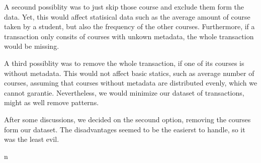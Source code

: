 A secound possiblity was to just skip those course and exclude them form the data. Yet, this would affect
statisical data such as the average amount of course taken by a student, but also the frequency of the other courses.
Furthermore, if a transaction only consits of courses with unkown metadata, the whole transaction would be missing.


A third possiblity was to remove the whole transaction, if one of its courses is without metadata. 
This would not affect basic statics, such as average number of courses, assuming that courses without metadata are distributed evenly, which we cannot garantie.
Nevertheless, we would minimize our dataset of transactions, might as well remove patterns.
\newline

After some discussions, we decided on the secound option, removing the courses form our dataset. The disadvantages seemed to be the easierst to handle, so it was the least evil. 






n



